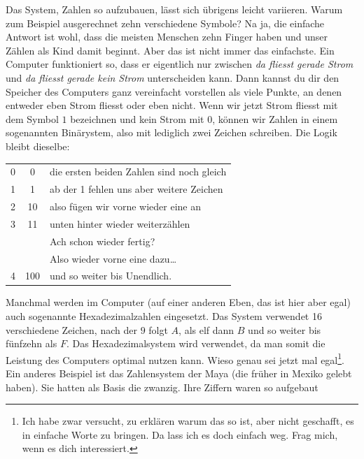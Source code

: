 Das System, Zahlen so aufzubauen, lässt sich übrigens leicht variieren. Warum zum Beispiel ausgerechnet zehn verschiedene Symbole? Na ja, die einfache Antwort ist wohl, dass die meisten Menschen zehn Finger haben und unser Zählen als Kind damit beginnt. Aber das ist nicht immer das einfachste. Ein Computer funktioniert so, dass er eigentlich nur zwischen \textit{da fliesst gerade Strom} und \textit{da fliesst gerade kein Strom} unterscheiden kann. Dann kannst du dir den Speicher des Computers ganz vereinfacht vorstellen als viele Punkte, an denen entweder eben Strom fliesst oder eben nicht. Wenn wir jetzt Strom fliesst mit dem Symbol $1$ bezeichnen und kein Strom mit $0$, können wir Zahlen in einem sogenannten Binärystem, also mit lediglich zwei Zeichen schreiben. Die Logik bleibt dieselbe:

\begin{small}
\begin{center}
       \sffamily
\begin{tabular}{ c c l }
0 & 0 & die ersten beiden Zahlen sind noch gleich\\
1 & 1 & ab der 1 fehlen uns aber weitere Zeichen \\
2 & 10 & also fügen wir vorne wieder eine an \\
3 & 11 & unten hinter wieder weiterzählen\\
& & Ach schon wieder fertig?\\
&& Also wieder vorne eine dazu\dots \\
4 & 100 & und so weiter bis Unendlich.
\end{tabular}
\end{center}
\end{small}
Manchmal werden im Computer (auf einer anderen Eben, das ist hier aber egal) auch sogenannte Hexadezimalzahlen eingesetzt. Das System verwendet 16 verschiedene Zeichen, nach der $9$ folgt $A$, als elf dann $B$ und so weiter bis fünfzehn als $F$. Das Hexadezimalsystem wird verwendet, da man somit die Leistung des Computers optimal nutzen kann. Wieso genau sei jetzt mal egal\footnote{Ich habe zwar versucht, zu erklären warum das so ist, aber nicht geschafft, es in einfache Worte zu bringen. Da lass ich es doch einfach weg. Frag mich, wenn es dich interessiert.}. Ein anderes Beispiel ist das Zahlensystem der Maya (die früher in Mexiko gelebt haben). Sie hatten als Basis die zwanzig. Ihre Ziffern waren so aufgebaut

